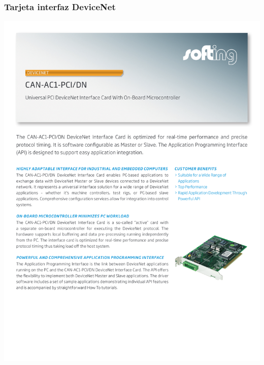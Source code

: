 \subsubsection{Tarjeta interfaz DeviceNet}
\hspace*{-2cm}
\includegraphics[page=2]{Datasheets/CAN012E2_201204_CAN-AC1_PCI_DN.pdf}
\newpage

